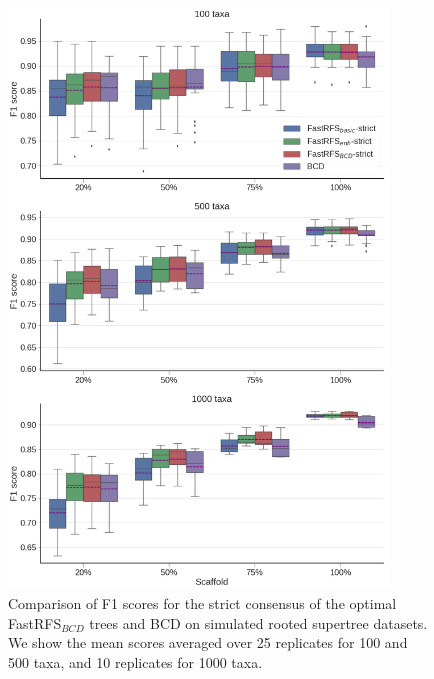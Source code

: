 \begin{figure}
  \centering
  \includegraphics[width=0.9\textwidth,height=0.8\textheight,keepaspectratio]{siesta-supp-figs/fastrfs_smidgenOG_f1}
  \caption[F1 scores for the strict consensus of the optimal FastRFS$_{BCD}$  trees and BCD on
    simulated rooted supertree datasets.]{Comparison of F1 scores for the strict consensus of the optimal FastRFS$_{BCD}$  trees and BCD on
    simulated rooted supertree datasets. We show the mean scores averaged over
    25 replicates for 100 and 500 taxa, and 10 replicates for 1000
    taxa.
    }
  \label{fig:supertree-consensus-comparison-8}
\end{figure}



